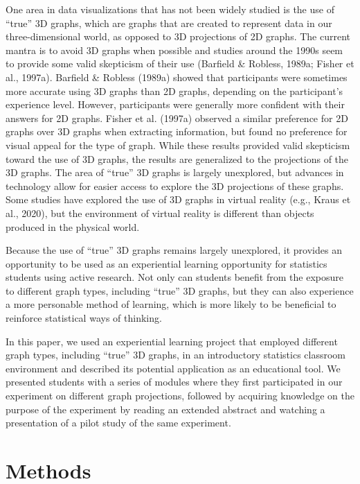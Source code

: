 \documentclass[phd]{nuthesis}
\begin{document}
One area in data visualizations that has not been widely studied is the
use of ``true'' 3D graphs, which are graphs that are created to
represent data in our three-dimensional world, as opposed to 3D
projections of 2D graphs. The current mantra is to avoid 3D graphs when
possible and studies around the 1990s seem to provide some valid
skepticism of their use (Barfield \& Robless, 1989a; Fisher et al.,
1997a). Barfield \& Robless (1989a) showed that participants were
sometimes more accurate using 3D graphs than 2D graphs, depending on the
participant's experience level. However, participants were generally
more confident with their answers for 2D graphs. Fisher et al. (1997a)
observed a similar preference for 2D graphs over 3D graphs when
extracting information, but found no preference for visual appeal for
the type of graph. While these results provided valid skepticism toward
the use of 3D graphs, the results are generalized to the projections of
the 3D graphs. The area of ``true'' 3D graphs is largely unexplored, but
advances in technology allow for easier access to explore the 3D
projections of these graphs. Some studies have explored the use of 3D
graphs in virtual reality (e.g., Kraus et al., 2020), but the
environment of virtual reality is different than objects produced in the
physical world.

Because the use of ``true'' 3D graphs remains largely unexplored, it
provides an opportunity to be used as an experiential learning
opportunity for statistics students using active research. Not only can
students benefit from the exposure to different graph types, including
``true'' 3D graphs, but they can also experience a more personable
method of learning, which is more likely to be beneficial to reinforce
statistical ways of thinking.

In this paper, we used an experiential learning project that employed
different graph types, including ``true'' 3D graphs, in an introductory
statistics classroom environment and described its potential application
as an educational tool. We presented students with a series of modules
where they first participated in our experiment on different graph
projections, followed by acquiring knowledge on the purpose of the
experiment by reading an extended abstract and watching a presentation
of a pilot study of the same experiment.

\section{Methods}\label{methods-1}
\end{document}
